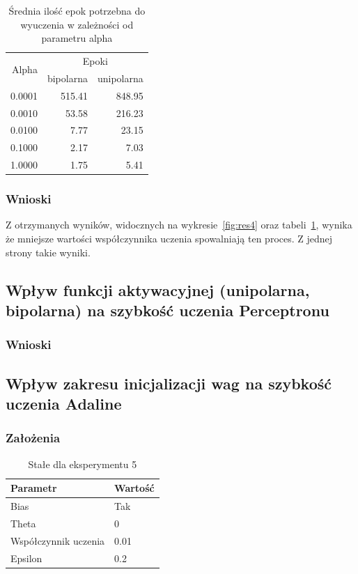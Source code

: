 \documentclass{article}
\begin{document}
\begin{table}[!h]
	\caption{Średnia ilość epok potrzebna do wyuczenia w zależności od parametru alpha}
	\label{tabela-res-4}
	\centering
	\begin{tabular}{rrr}
		\toprule
		\multirow{2}{*}{Alpha}   & \multicolumn{2}{c}{Epoki} \\
		       & bipolarna & unipolarna \\
		\midrule
		0.0001 & 515.41    & 848.95     \\
		0.0010 & 53.58     & 216.23     \\
		0.0100 & 7.77      & 23.15      \\
		0.1000 & 2.17      & 7.03       \\
		1.0000 & 1.75      & 5.41       \\
		\bottomrule
	\end{tabular}
\end{table}

\subsubsection*{Wnioski}

Z otrzymanych wyników, widocznych na wykresie~\ref{fig:res4} oraz tabeli~\ref{tabela-res-4}, wynika że mniejsze wartości współczynnika uczenia spowalniają ten proces. Z jednej strony takie wyniki.

\newpage
\subsection{Wpływ funkcji aktywacyjnej (unipolarna, bipolarna) na szybkość uczenia Perceptronu}
\subsubsection*{Wnioski}

\newpage
\subsection{Wpływ zakresu inicjalizacji wag na szybkość uczenia Adaline}
\subsubsection*{Założenia}
\begin{table}[!h]
	\caption{Stałe dla eksperymentu 5}
	\label{tabela-const-5}
	\centering
	\begin{tabular}{ll}
		\toprule
		Parametr               & Wartość \\
		\midrule
		Bias                   & Tak       \\
		Theta                  & 0         \\
		Współczynnik uczenia & 0.01      \\
		Epsilon                & 0.2       \\
		\bottomrule
	\end{tabular}
\end{table}
\end{document}
